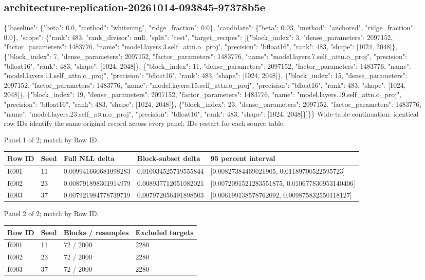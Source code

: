 \documentclass[10pt]{article}
\begin{document}
\subsection{architecture-replication-20261014-093845-97378b5e}
\{"baseline": \{"beta": 0.0, "method": "whitening", "ridge\_fraction": 0.0\}, "candidate": \{"beta": 0.03, "method": "anchored", "ridge\_fraction": 0.0\}, "scope": \{"rank": 483, "rank\_divisor": null, "split": "test", "target\_recipes": [\{"block\_index": 3, "dense\_parameters": 2097152, "factor\_parameters": 1483776, "name": "model.layers.3.self\_attn.o\_proj", "precision": "bfloat16", "rank": 483, "shape": [1024, 2048]\}, \{"block\_index": 7, "dense\_parameters": 2097152, "factor\_parameters": 1483776, "name": "model.layers.7.self\_attn.o\_proj", "precision": "bfloat16", "rank": 483, "shape": [1024, 2048]\}, \{"block\_index": 11, "dense\_parameters": 2097152, "factor\_parameters": 1483776, "name": "model.layers.11.self\_attn.o\_proj", "precision": "bfloat16", "rank": 483, "shape": [1024, 2048]\}, \{"block\_index": 15, "dense\_parameters": 2097152, "factor\_parameters": 1483776, "name": "model.layers.15.self\_attn.o\_proj", "precision": "bfloat16", "rank": 483, "shape": [1024, 2048]\}, \{"block\_index": 19, "dense\_parameters": 2097152, "factor\_parameters": 1483776, "name": "model.layers.19.self\_attn.o\_proj", "precision": "bfloat16", "rank": 483, "shape": [1024, 2048]\}, \{"block\_index": 23, "dense\_parameters": 2097152, "factor\_parameters": 1483776, "name": "model.layers.23.self\_attn.o\_proj", "precision": "bfloat16", "rank": 483, "shape": [1024, 2048]\}]\}\}
Wide-table continuation: identical row IDs identify the same original record across every panel; IDs restart for each source table.
\par\noindent Panel 1 of 2; match by Row ID.
{\scriptsize\setlength{\tabcolsep}{2pt}
\begin{longtable}{p{}p{}p{}p{}p{}}
Row ID & Seed & Full NLL delta & Block-subset delta & 95 percent interval \\
\hline\endhead
R001 & 11 & 0.009941660681098283 & 0.010034525719555844 & [0.00827384469021905, 0.01189700522595723] \\
R002 & 23 & 0.008791898301914979 & 0.008937712051082021 & [0.0072091521283551875, 0.010677830953140406] \\
R003 & 37 & 0.007921984778739719 & 0.007972056491898503 & [0.006199138578762092, 0.009875832550118127] \\
\end{longtable}}
\par\noindent Panel 2 of 2; match by Row ID.
{\scriptsize\setlength{\tabcolsep}{2pt}
\begin{longtable}{p{}p{}p{}p{}}
Row ID & Seed & Blocks / resamples & Excluded targets \\
\hline\endhead
R001 & 11 & 72 / 2000 & 2280 \\
R002 & 23 & 72 / 2000 & 2280 \\
R003 & 37 & 72 / 2000 & 2280 \\
\end{longtable}}
\end{document}
